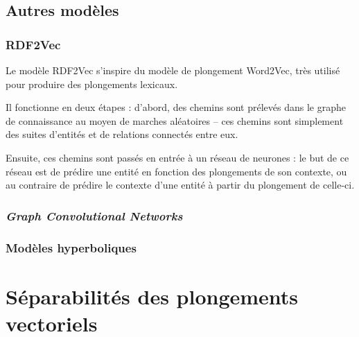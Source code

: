 \subsection{Autres modèles}
\label{subsec:kge-models-misc}

\subsubsection{RDF2Vec}

Le modèle RDF2Vec s'inspire du modèle de plongement Word2Vec, très utilisé pour produire des plongements lexicaux.

Il fonctionne en deux étapes : d'abord, des chemins sont prélevés dans le graphe de connaissance au moyen de marches aléatoires – ces chemins sont simplement des suites d'entités et de relations connectés entre eux.


Ensuite, ces chemins sont passés en entrée à un réseau de neurones : le but de ce réseau est de prédire une entité en fonction des plongements de son contexte, ou au contraire de prédire le contexte d'une entité à partir du plongement de celle-ci.


\subsubsection{\textit{Graph Convolutional Networks}}
\subsubsection{Modèles hyperboliques}


\section{Séparabilités des plongements vectoriels}


